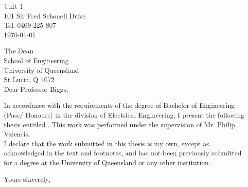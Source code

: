 \begin{flushright}
	Unit 1 \\
	101 Sir Fred Schonell Drive \\
	Tel. 0409 225 807 \\
	\medskip
	\today
\end{flushright}
\begin{flushleft}
  The Dean\\
  School of Engineering\\
  University of Queensland\\
  St Lucia, Q 4072\\
  \bigskip\bigskip
  Dear Professor Biggs,
\end{flushleft}

In accordance with the requirements of the degree of Bachelor of
Engineering (Pass/ Honours) in the division of Electrical Engineering, I present the
following thesis entitled \Title . This work was performed  under the supervision of Mr. Philip Valencia.  \\

I declare that the work submitted in this thesis is my own, except as acknowledged in the text and footnotes, and has not been previously submitted for a degree at the University of Queensland or any other institution.

\begin{flushright}
	Yours sincerely,\\
	 \bigskip\bigskip\bigskip
	\Author
\end{flushright}